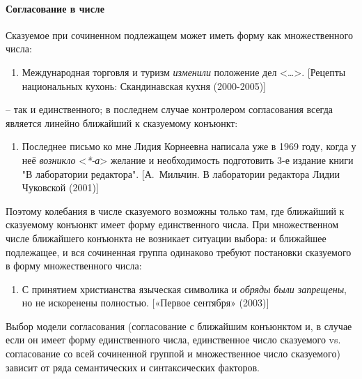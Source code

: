 \hypertarget{ux441ux43eux433ux43bux430ux441ux43eux432ux430ux43dux438ux435-ux432-ux447ux438ux441ux43bux435}{%
\paragraph{Согласование в
числе}\label{ux441ux43eux433ux43bux430ux441ux43eux432ux430ux43dux438ux435-ux432-ux447ux438ux441ux43bux435}}

Сказуемое при сочиненном подлежащем может иметь форму как множественного
числа:

\begin{enumerate}
\def\labelenumi{(\arabic{enumi})}
\setcounter{enumi}{82}
\item
  Международная торговля и туризм \emph{изменили} положение дел
  \textless\ldots\textgreater. {[}Рецепты национальных кухонь:
  Скандинавская кухня (2000-2005){]}
\end{enumerate}

-- так и единственного; в последнем случае контролером согласования
всегда является линейно ближайший к сказуемому конъюнкт:

\begin{enumerate}
\def\labelenumi{(\arabic{enumi})}
\setcounter{enumi}{83}
\item
  Последнее письмо ко мне Лидия Корнеевна написала уже в 1969 году,
  когда у неё \emph{возникло} \textless{}\emph{*-а}\textgreater{}
  желание и необходимость подготовить 3-е издание книги "В лаборатории
  редактора". {[}А.~Мильчин. В лаборатории редактора Лидии Чуковской
  (2001){]}
\end{enumerate}

Поэтому колебания в числе сказуемого возможны только там, где ближайший
к сказуемому конъюнкт имеет форму единственного числа. При множественном
числе ближайшего конъюнкта не возникает ситуации выбора: и ближайшее
подлежащее, и вся сочиненная группа одинаково требуют постановки
сказуемого в форму множественного числа:

\begin{enumerate}
\def\labelenumi{(\arabic{enumi})}
\setcounter{enumi}{84}
\item
  С принятием христианства языческая символика и \emph{обряды}
  \emph{были запрещены}, но не искоренены полностью. {[}«Первое
  сентября» (2003){]}
\end{enumerate}

Выбор модели согласования (согласование с ближайшим конъюнктом и, в
случае если он имеет форму единственного числа, единственное число
сказуемого vs. согласование со всей сочиненной группой и множественное
число сказуемого) зависит от ряда семантических и синтаксических
факторов.

